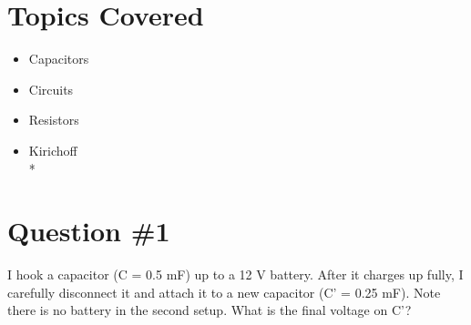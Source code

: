 \documentclass[12pt]{article}
\begin{document}
\maketitle

\section*{Topics Covered}
\begin{itemize}
\item Capacitors
\item Circuits
\item Resistors
\item Kirichoff\\*
\end{itemize}

\section*{Question \#1}
I hook a capacitor (C = 0.5 mF) up to a 12 V battery.  After it charges up fully, I carefully disconnect it and attach it to a new capacitor (C' = 0.25 mF).  Note there is no battery in the second setup.  What is the final voltage on C'?
\end{document}
